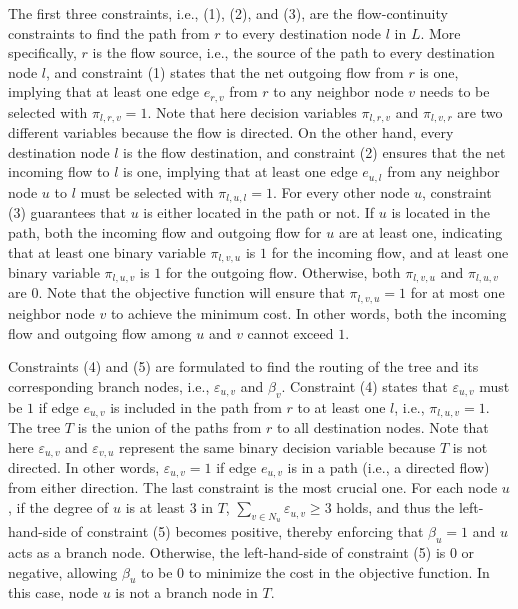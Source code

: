 \documentclass[conference]{IEEEtran}
\begin{document}
The first three constraints, i.e., (1), (2), and (3), are the flow-continuity constraints to find the
path from $r$ to every destination node $l$ in $L$. More specifically, $r$ is the
flow source, i.e., the source of the path to every destination node $l$, and
constraint (1) states that the net outgoing flow from $r$ is one, implying
that at least one edge $e_{r,v}$ from $r$ to any neighbor node $v$ needs to
be selected with $\pi _{l,r,v}=1$. Note that here decision variables $\pi
_{l,r,v}$ and $\pi _{l,v,r}$ are two different variables because the flow is
directed. On the other hand, every destination node $l$ is the flow destination,
and constraint (2) ensures that the net incoming flow to $l$ is one,
implying that at least one edge $e_{u,l}$ from any neighbor node $u$ to $l$
must be selected with $\pi _{l,u,l}=1$. For every other node $u$, constraint
(3) guarantees that $u$ is either located in the path or not. If $u$ is
located in the path, both the incoming flow and outgoing flow for $u$ are at
least one, indicating that at least one binary variable $\pi _{l,v,u}$ is $1$
for the incoming flow, and at least one binary variable $\pi _{l,u,v}$ is $1$
for the outgoing flow. Otherwise, both $\pi _{l,v,u}$ and $\pi _{l,u,v}$ are
$0$. Note that the objective function will ensure that $\pi _{l,v,u}=1$ for
at most one neighbor node $v$ to achieve the minimum cost. In other words,
both the incoming flow and outgoing flow among $u$ and $v$ cannot exceed $1$.

Constraints (4) and (5) are formulated to find the routing of the tree and
its corresponding branch nodes, i.e., $\varepsilon _{u,v}$ and $\beta _{v}$.
Constraint (4) states that $\varepsilon _{u,v}$ must be $1$ if edge $e_{u,v}$ is
included in the path from $r$ to at least one $l$, i.e., $\pi _{l,u,v}=1$. The tree $T$ is the
union of the paths from $r$ to all destination nodes. Note that here $\varepsilon _{u,v}$ and $\varepsilon _{v,u}$ represent the same binary
decision variable because $T$ is not directed. In other words, $\varepsilon
_{u,v}=1$ if edge $e_{u,v}$ is in a path (i.e., a directed flow) from either
direction. The last constraint is the most crucial one. For each node $u$,
if the degree of $u$ is at least $3$ in $T$, $\sum_{v\in
N_{u}}\varepsilon _{u,v}\geq3$ holds, and thus the left-hand-side of
constraint (5) becomes positive, thereby enforcing that $\beta _{u}=1$ and $u $ acts as a branch node. Otherwise, the left-hand-side of constraint (5)
is $0$ or negative, allowing $\beta _{u}$ to be $0$ to minimize the cost in
the objective function. In this case, node $u$ is not a branch node in $T$.
\end{document}
